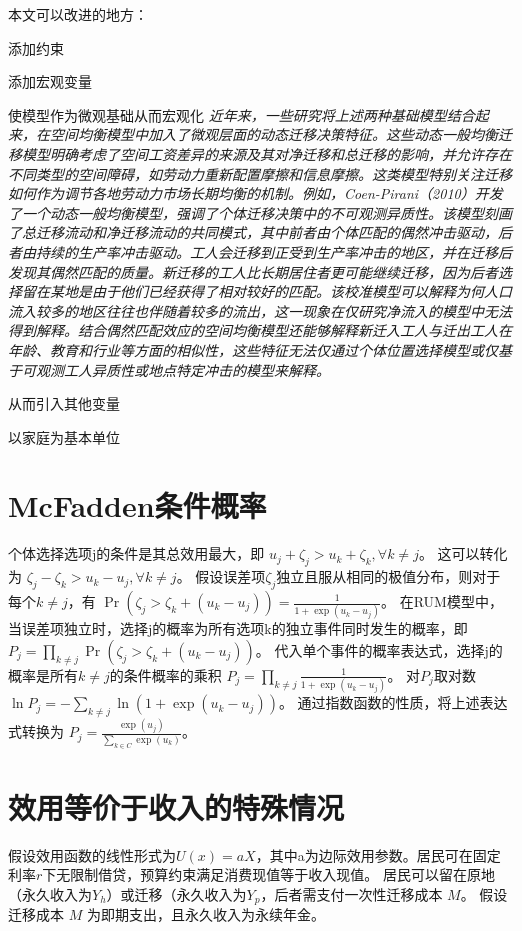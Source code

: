 \documentclass[a4paper,12pt,oneside, fontset=mac]{ctexbook} %
\begin{document}
本文可以改进的地方：

添加约束

添加宏观变量

使模型作为微观基础从而宏观化
\textit{近年来，一些研究将上述两种基础模型结合起来，在空间均衡模型中加入了微观层面的动态迁移决策特征。这些动态一般均衡迁移模型明确考虑了空间工资差异的来源及其对净迁移和总迁移的影响，并允许存在不同类型的空间障碍，如劳动力重新配置摩擦和信息摩擦。这类模型特别关注迁移如何作为调节各地劳动力市场长期均衡的机制。例如，Coen-Pirani（2010）开发了一个动态一般均衡模型，强调了个体迁移决策中的不可观测异质性。该模型刻画了总迁移流动和净迁移流动的共同模式，其中前者由个体匹配的偶然冲击驱动，后者由持续的生产率冲击驱动。工人会迁移到正受到生产率冲击的地区，并在迁移后发现其偶然匹配的质量。新迁移的工人比长期居住者更可能继续迁移，因为后者选择留在某地是由于他们已经获得了相对较好的匹配。该校准模型可以解释为何人口流入较多的地区往往也伴随着较多的流出，这一现象在仅研究净流入的模型中无法得到解释。结合偶然匹配效应的空间均衡模型还能够解释新迁入工人与迁出工人在年龄、教育和行业等方面的相似性，这些特征无法仅通过个体位置选择模型或仅基于可观测工人异质性或地点特定冲击的模型来解释。}

从而引入其他变量

以家庭为基本单位


\newpage
\appendix

\chapter{McFadden条件概率}

个体选择选项j的条件是其总效用最大，即
$u_j + \zeta_j > u_k + \zeta_k, \forall k \neq j$。
这可以转化为
$\zeta_j - \zeta_k > u_k - u_j, \forall k \neq j$。
假设误差项$\zeta_j$独立且服从相同的极值分布，则对于每个$k \neq j$，有
$\Pr(\zeta_j > \zeta_k + (u_k - u_j)) = \frac{1}{1 + \exp(u_k - u_j)}$。
在RUM模型中，当误差项独立时，选择j的概率为所有选项k的独立事件同时发生的概率，即
$P_j = \prod\limits_{k \neq j} \Pr(\zeta_j > \zeta_k + (u_k - u_j))$。
代入单个事件的概率表达式，选择j的概率是所有$k \neq j$的条件概率的乘积
$P_j = \prod\limits_{k \neq j} \frac{1}{1 + \exp(u_k - u_j)}$。
对$P_j$取对数
$\ln P_j = - \sum_{k \neq j} \ln(1 + \exp(u_k - u_j))$。
通过指数函数的性质，将上述表达式转换为
$P_j = \frac{\exp(u_j)}{\sum\limits_{k \in C} \exp(u_k)}$。

\chapter{效用等价于收入的特殊情况}
假设效用函数的线性形式为$U(x)=a X$，其中a为边际效用参数。居民可在固定利率$r$下无限制借贷，预算约束满足消费现值等于收入现值。
居民可以留在原地（永久收入为$Y_h$）或迁移（永久收入为$Y_p$，后者需支付一次性迁移成本 $M$。
假设迁移成本 
$M$
为即期支出，且永久收入为永续年金。
\end{document}
